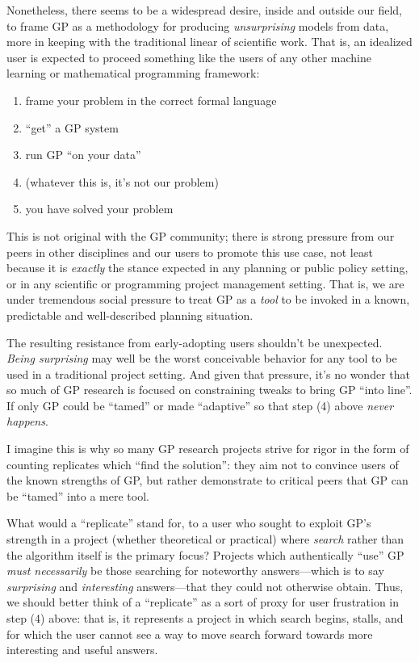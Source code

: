 Nonetheless, there seems to be a widespread desire, inside and outside our field, to frame GP as a methodology for producing \emph{unsurprising} models from data, more in keeping with the traditional linear of scientific work. That is, an idealized user is expected to proceed something like the users of any other machine learning or mathematical programming framework:

\begin{enumerate}
\item frame your problem in the correct formal language
\item ``get'' a GP system
\item run GP ``on your data''
\item (whatever this is, it's not our problem)
\item you have solved your problem
\end{enumerate}

This is not original with the GP community; there is strong pressure from our peers in other disciplines and our users to promote this use case, not least because it is \emph{exactly} the stance expected in any planning or public policy setting, or in any scientific or programming project management setting. That is, we are under tremendous social pressure to treat GP as a \emph{tool} to be invoked in a known, predictable and well-described planning situation.

The resulting resistance from early-adopting users shouldn't be unexpected. \emph{Being surprising} may well be the worst conceivable behavior for any tool to be used in a traditional project setting. And given that pressure, it's no wonder that so much of GP research is focused on constraining tweaks to bring GP ``into line''. If only GP could be ``tamed'' or made ``adaptive'' so that step (4) above \emph{never happens}.

I imagine this is why so many GP research projects strive for rigor in the form of counting replicates which ``find the solution'': they aim not to convince users of the known strengths of GP, but rather demonstrate to critical peers that GP can be ``tamed'' into a mere tool.

What would a ``replicate'' stand for, to a user who sought to exploit GP's strength in a project (whether theoretical or practical) where \emph{search} rather than the algorithm itself is the primary focus? Projects which authentically ``use'' GP \emph{must necessarily} be those searching for noteworthy answers---which is to say \emph{surprising} and \emph{interesting} answers---that they could not otherwise obtain. Thus, we should better think of a ``replicate'' as a sort of proxy for user frustration in step (4) above: that is, it represents a project in which search begins, stalls, and for which the user cannot see a way to move search forward towards more interesting and useful answers.

